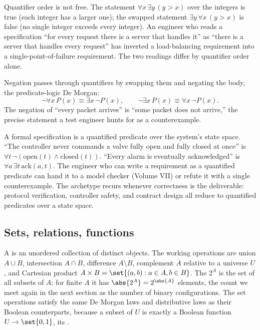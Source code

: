 Quantifier order is not free. The statement $\forall x\, \exists y\,
(y > x)$ over the integers is true (each integer has a larger one);
the swapped statement $\exists y\, \forall x\, (y > x)$ is false (no
single integer exceeds every integer). An engineer who reads a
specification ``for every request there is a server that handles
it'' as ``there is a server that handles every request'' has
inverted a load-balancing requirement into a single-point-of-failure
requirement. The two readings differ by quantifier order alone.

Negation passes through quantifiers by swapping them and negating
the body, the predicate-logic De Morgan:
\[
\lnot \forall x\, P(x) \equiv \exists x\, \lnot P(x),
\qquad
\lnot \exists x\, P(x) \equiv \forall x\, \lnot P(x).
\]
The negation of ``every packet arrives'' is ``some packet does not
arrive,'' the precise statement a test engineer hunts for as a
counterexample.

\begin{archetype}[Specification]
A formal specification is a quantified predicate over the system's
state space. ``The controller never commands a valve fully open and
fully closed at once'' is $\forall t\, \lnot(\mathrm{open}(t) \land
\mathrm{closed}(t))$. ``Every alarm is eventually acknowledged'' is
$\forall a\, \exists t\, \mathrm{ack}(a, t)$. The engineer who can
write a requirement as a quantified predicate can hand it to a model
checker (Volume VII) or refute it with a single counterexample. The
archetype recurs whenever correctness is the deliverable: protocol
verification, controller safety, and contract design all reduce to
quantified predicates over a state space.
\end{archetype}

\subsection{Sets, relations, functions}

A  is an unordered collection of distinct objects. The
working operations are union $A \cup B$, intersection $A \cap B$,
difference $A \setminus B$, complement $\overline{A}$ relative to a
universe $U$, and Cartesian product $A \times B = \set{(a, b) : a
\in A, b \in B}$. The  $2^{A}$ is the set of all
subsets of $A$; for finite $A$ it has $\abs{2^{A}} = 2^{\abs{A}}$
elements, the count we meet again in the next section as the number
of binary configurations. The set operations satisfy the same De
Morgan laws and distributive laws as their Boolean counterparts,
because a subset of $U$ is exactly a Boolean function $U \to \set{0,
1}$, its .


